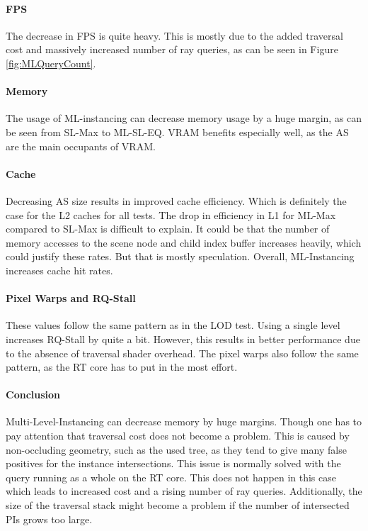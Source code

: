 \paragraph{FPS}
The decrease in FPS is quite heavy. This is mostly due to the added traversal cost and massively increased number of ray queries, as can be seen in Figure \ref{fig:MLQueryCount}.
\paragraph{Memory}
The usage of ML-instancing can decrease memory usage by a huge margin, as can be seen from SL-Max to ML-SL-EQ. VRAM benefits especially well, as the AS are the main occupants of VRAM.
\paragraph{Cache}
Decreasing AS size results in improved cache efficiency. Which is definitely the case for the L2 caches for all tests. The drop in efficiency in L1 for ML-Max compared to SL-Max is difficult to explain. It could be that the number of memory accesses to the scene node and child index buffer increases heavily, which could justify these rates. But that is mostly speculation. Overall, ML-Instancing increases cache hit rates.
\paragraph{Pixel Warps and RQ-Stall}
These values follow the same pattern as in the LOD test. Using a single level increases RQ-Stall by quite a bit. However, this results in better performance due to the absence of traversal shader overhead. The pixel warps also follow the same pattern, as the RT core has to put in the most effort.
\paragraph{Conclusion}
Multi-Level-Instancing can decrease memory by huge margins. Though one has to pay attention that traversal cost does not become a problem. This is caused by non-occluding geometry, such as the used tree, as they tend to give many false positives for the instance intersections. This issue is normally solved with the query running as a whole on the RT core. This does not happen in this case which leads to increased cost and a rising number of ray queries. Additionally, the size of the traversal stack might become a problem if the number of intersected PIs grows too large.

